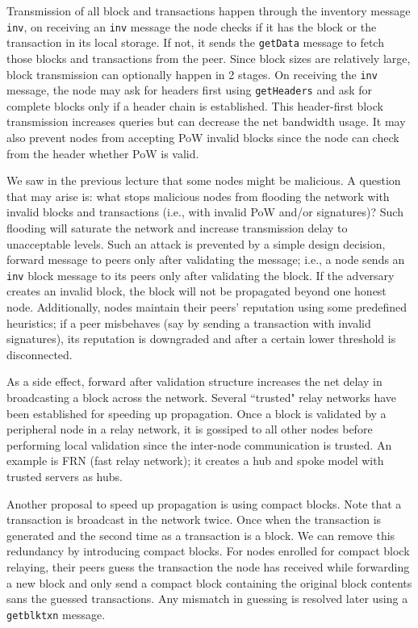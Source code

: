 \documentclass{article}
\begin{document}
Transmission of all block and transactions happen through the inventory message {\tt inv}, on receiving an {\tt inv} message the node checks if it has the block or the transaction in its local storage. If not, it sends the {\tt getData} message to fetch those blocks and transactions from the peer. Since block sizes are relatively large, block transmission can optionally happen in 2 stages. On receiving the {\tt inv} message, the node may ask for headers first using {\tt getHeaders} and ask for complete blocks only if a header chain is established. This header-first block transmission increases queries but can decrease the net bandwidth usage. It may also prevent nodes from accepting PoW invalid blocks since the node can check from the header whether PoW is valid. 

We saw in the previous lecture that some nodes might be malicious. A question that may arise is: what stops malicious nodes from flooding the network with invalid blocks and transactions (i.e., with invalid PoW and/or signatures)? Such flooding will saturate the network and increase transmission delay to unacceptable levels. Such an attack is prevented by a simple design decision, forward message to peers only after validating the message; i.e., a node sends an {\tt inv} block message to its peers only after validating the block. If the adversary creates an invalid block, the block will not be propagated beyond one honest node. Additionally, nodes maintain their peers' reputation using some predefined heuristics; if a peer misbehaves (say by sending a transaction with invalid signatures), its reputation is downgraded and after a certain lower threshold is disconnected.  

As a side effect, forward after validation structure increases the net delay in broadcasting a block across the network. Several ``trusted" relay networks have been established for speeding up propagation. Once a block is validated by a peripheral node in a relay network, it is gossiped to all other nodes before performing local validation since the inter-node communication is trusted. An example is FRN (fast relay network); it creates a hub and spoke model with trusted servers as hubs. 

Another proposal to speed up propagation is using compact blocks. Note that a transaction is broadcast in the network twice. Once when the transaction is generated and the second time as a transaction is a block. We can remove this redundancy by introducing compact blocks. For nodes enrolled for compact block relaying, their peers guess the transaction the node has received while forwarding a new block and only send a compact block containing the original block contents sans the guessed transactions. Any mismatch in guessing is resolved later using a {\tt getblktxn} message. 
\end{document}
